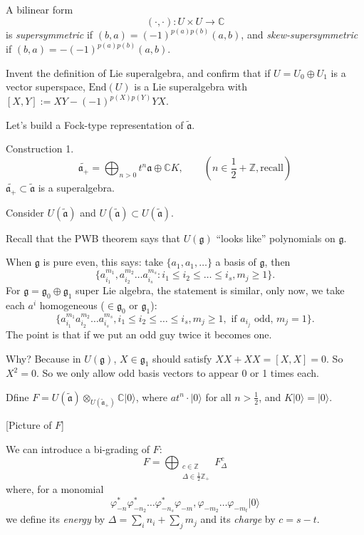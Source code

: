 \begin{definition}
\label{definition-supersymmetric}
A bilinear form
$$
(\cdot,\cdot):U \times U \to \mathbb{C}
$$
is
{\it supersymmetric} if
$(b,a)=(-1)^{p(a)p(b)}(a,b)$,
and {\it skew-supersymmetric} if
 $(b,a)=-(-1)^{p(a)p(b)}(a,b)$.
\end{definition}

\begin{exercise}
\label{exercise-Lie-superalgebra}
Invent the definition of Lie superalgebra,
and confirm that if $U=U_0 \oplus U_1$
is a vector superspace,
$\text{End}(U)$ is a Lie superalgebra
with $[X,Y]:=XY-(-1)^{p(X)p(Y)}YX$.
\end{exercise}

\medskip\noindent
Let's build a Fock-type representation of
$\tilde{\mathfrak{a}}$.

Construction 1.
$$
\tilde{\mathfrak{a}_+}=
\bigoplus_{n>0}t^n\mathfrak{a}
\oplus\mathbb{C}K,
\qquad (n \in \frac{1}{2}+\mathbb{Z},\text{
recall})
$$
$\tilde{\mathfrak{a}_+}\subset
\tilde{\mathfrak{a}}$ is
a superalgebra.

Consider $U(\tilde{\mathfrak{a}})$
and $U(\tilde{\mathfrak{a}})\subset
U(\tilde{\mathfrak{a}})$.

Recall that the PWB theorem says
that $U(\mathfrak{g})$ ``looks like''
polynomials on $\mathfrak{g}$.

When $\mathfrak{g}$ is pure even,
this says:
take $\{a_1,a_1,\ldots\}$ a basis of
$\mathfrak{g}$,
then
$$
\{a_{i_1}^{m_1},a_{i_2}^{m_2}\ldots
a_{i_s}^{m_s}:
i_1\leq i_2\leq \ldots\leq i_s,m_j \geq 1\}.
$$
For $\mathfrak{g}=\mathfrak{g}_0 \oplus
\mathfrak{g}_1$
super Lie algebra,
the statement is similar,
only now, we take each $a^i$ homogeneous
($\in \mathfrak{g}_0$ or $\mathfrak{g}_1$):
$$
\{a_{i_1}^{m_1}a_{i_2}^{m_2}\ldots
a_{i_s}^{m_s},
i_1\leq i_2 \leq \ldots \leq i_s, m_j\geq 1,
\text{ if }a_{i_j}\text{ odd, }m_j=1\}.
$$
The point is that if we put an odd guy
twice it becomes one.

Why? Because in $U(\mathfrak{g})$, $X \in
\mathfrak{g}_1$ should
satisfy $X X + X X=[X,X]=0$.
So  $X^2=0$. So we only allow
odd basis vectors to appear 0 or 1 times
each.

\medskip\noindent
Dfine
$F=U(\tilde{\mathfrak{a}})
\otimes_{U(\tilde{\mathfrak{a}}_+)}
\mathbb{C}|0\rangle$,
where $at^n\cdot|0\rangle$ for all
$n>\frac{1}{2}$, and
$K|0\rangle=|0\rangle$.

[Picture of $F$]

We can introduce a bi-grading of $F$:
$$
F=\bigoplus_{\substack{c \in \mathbb{Z} \\
\Delta \in \frac{1}{2}\mathbb{Z}_+}}
F_\Delta^c
$$
where, for a monomial
$$
\varphi^*_{-n}\varphi^*_{-n_2}\ldots
\varphi_{-n_s}^*
\varphi_{-m},\varphi_{-m_2}\ldots
\varphi_{-m_t}|0\rangle
$$
we define its {\it energy} by
$\Delta=\sum_in_i+\sum_jm_j$
and its {\it charge} by $c=s-t$.


